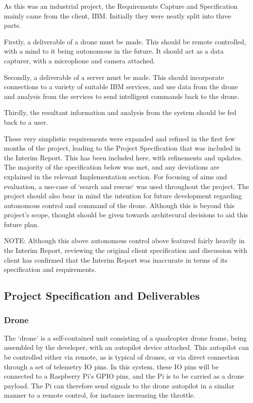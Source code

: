 \documentclass{article}
\begin{document}
As this was an industrial project, the Requirements Capture and Specification mainly came from the client, IBM. Initially they were neatly split into three parts.

Firstly, a deliverable of a drone must be made. This should be remote controlled, with a mind to it being autonomous in the future. It should act as a data capturer, with a microphone and camera attached.

Secondly, a deliverable of a server must be made. This should incorporate connections to a variety of suitable IBM services, and use data from the drone and analysis from the services to send intelligent commands back to the drone.

Thirdly, the resultant information and analysis from the system should be fed back to a user. 

These very simplistic requirements were expanded and refined in the first few months of the project, leading to the Project Specification that was included in the Interim Report. This has been included here, with refinements and updates. The majority of the specification below was met, and any deviations are explained in the relevant Implementation section. For focusing of aims and evaluation, a use-case of `search and rescue` was used throughout the project. The project should also bear in mind the intention for future development regarding autonomous control and command of the drone. Although this is beyond this project's scope, thought should be given towards architecural decisions to aid this future plan. 

NOTE: Although this above autonomous control above featured fairly heavily in the Interim Report, reviewing the original client specification and discussion with client has confirmed that the Interim Report was inaccurate in terms of its specification and requirements. 

\subsection{Project Specification and Deliverables}
\subsubsection{Drone}
The `drone' is a self-contained unit consisting of a quadcopter drone frame, being assembled by the developer, with an autopilot device attached. This autopilot can be controlled either via remote, as is typical of drones, or via direct connection through a set of telemetry IO pins. In this system, these IO pins will be connected to a Raspberry Pi's GPIO pins, and the Pi is to be carried as a drone payload. The Pi can therefore send signals to the drone autopilot in a similar manner to a remote control, for instance increasing the throttle.
\end{document}
